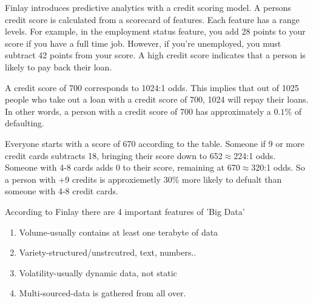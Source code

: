 \documentclass[12pt]{article}
\begin{document}

\begin{enumerate}


Finlay introduces predictive analytics with a credit scoring model. A persons credit score is calculated from a scorecard of features. Each feature has a range levels. For example, in the employment status feature, you add 28 points to your score if you have a full time job. However, if you're unemployed, you must subtract 42 points from your score. A high credit score indicates that a person is likely to pay back their loan.


A credit score of 700 corresponds to 1024:1 odds. This implies that out of 1025 people who take out a loan with a credit score of 700, 1024 will repay their loans. In other words, a person with a credit score of 700 has approximately a $0.1\%$ of defaulting. 


Everyone starts with a score of 670 according to the table. Someone if 9 or more credit cards subtracts 18, bringing their score down to 652$\approx$224:1 odds. Someone with 4-8 cards adds 0 to their score, remaining at 670$\approx$320:1 odds. 
So a person with +9 credits is approxiemetly 30$\%$ more likely to defualt than someone with 4-8 credit cards.


According to Finlay there are 4 important features of 'Big Data' \begin{enumerate}
\item Volume-usually contains at least one terabyte of data
\item Variety-structured/unstrcutred, text, numbers..
\item Volatility-usually dynamic data, not static
\item Multi-sourced-data is gathered from all over.
\end{enumerate}

\end{enumerate}
\end{document}
